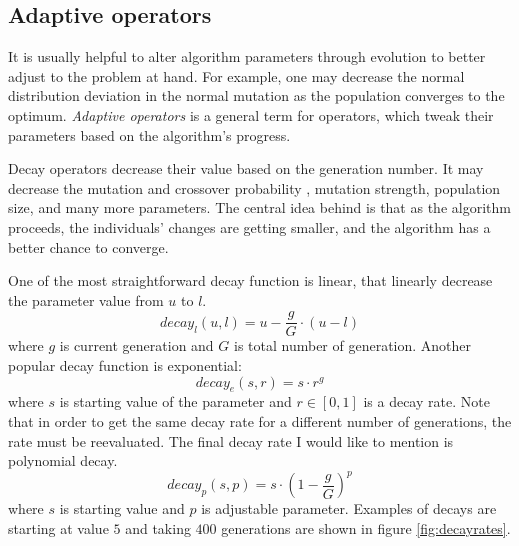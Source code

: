 \subsection{Adaptive operators}
\label{chap:adaptiveoperators}

It is usually helpful to alter algorithm parameters through evolution to better adjust to the problem at hand. For example, one may decrease the normal distribution deviation in the normal mutation as the population converges to the optimum. \emph{Adaptive operators} is a general term for operators, which tweak their parameters based on the algorithm's progress.

Decay operators decrease their value based on the generation number. It may decrease the mutation and crossover probability \citep{DecayGA}, mutation strength, population size, and many more parameters. The central idea behind is that as the algorithm proceeds, the individuals' changes are getting smaller, and the algorithm has a better chance to converge.

One of the most straightforward decay function is linear, that linearly decrease the parameter value from $u$ to $l$.
$$
decay_l(u,l) = u - \frac{g}{G}\cdot\left( u - l \right)
$$
where $g$ is current generation and $G$ is total number of generation. Another popular decay function is exponential:
$$
decay_e(s,r) = s\cdot r^g
$$
where $s$ is starting value of the parameter and $r\in\left[0,1\right]$ is a decay rate. Note that in order to get the same decay rate for a different number of generations, the rate must be reevaluated.
The final decay rate I would like to mention is polynomial decay.
$$
decay_p(s,p) = s \cdot\left(1 - \frac{g}{G}\right)^p
$$
where $s$ is starting value and $p$ is adjustable parameter. Examples of decays are starting at value $5$ and taking $400$ generations are shown in figure \ref{fig:decayrates}.

